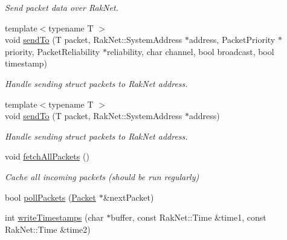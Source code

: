 \begin{DoxyCompactItemize}
\begin{DoxyCompactList}\small\item\em Send packet data over Rak\-Net. \end{DoxyCompactList}\item 
\hypertarget{class_champ_net_1_1_network_ad24d4552c6b597b5667965c323221aaa}{{\footnotesize template$<$typename T $>$ }\\void \hyperlink{class_champ_net_1_1_network_ad24d4552c6b597b5667965c323221aaa}{send\-To} (T packet, Rak\-Net\-::\-System\-Address $\ast$address, Packet\-Priority $\ast$priority, Packet\-Reliability $\ast$reliability, char channel, bool broadcast, bool timestamp)}\label{class_champ_net_1_1_network_ad24d4552c6b597b5667965c323221aaa}

\begin{DoxyCompactList}\small\item\em Handle sending struct packets to Rak\-Net address. \end{DoxyCompactList}\item 
\hypertarget{class_champ_net_1_1_network_abcd324ec71ef70454b7e4476f070c932}{{\footnotesize template$<$typename T $>$ }\\void \hyperlink{class_champ_net_1_1_network_abcd324ec71ef70454b7e4476f070c932}{send\-To} (T packet, Rak\-Net\-::\-System\-Address $\ast$address)}\label{class_champ_net_1_1_network_abcd324ec71ef70454b7e4476f070c932}

\begin{DoxyCompactList}\small\item\em Handle sending struct packets to Rak\-Net address. \end{DoxyCompactList}\item 
\hypertarget{class_champ_net_1_1_network_a981aef84fbe239079ea158931e5eeb71}{void \hyperlink{class_champ_net_1_1_network_a981aef84fbe239079ea158931e5eeb71}{fetch\-All\-Packets} ()}\label{class_champ_net_1_1_network_a981aef84fbe239079ea158931e5eeb71}

\begin{DoxyCompactList}\small\item\em Cache all incoming packets (should be run regularly) \end{DoxyCompactList}\item 
bool \hyperlink{class_champ_net_1_1_network_ae01cddc2981169cda9f4d65661c204f6}{poll\-Packets} (\hyperlink{class_champ_net_1_1_packet}{Packet} $\ast$\&next\-Packet)
\item 
\hypertarget{class_champ_net_1_1_network_af31e6a74b5354057bd01c95670e3c7a3}{int \hyperlink{class_champ_net_1_1_network_af31e6a74b5354057bd01c95670e3c7a3}{write\-Timestamps} (char $\ast$buffer, const Rak\-Net\-::\-Time \&time1, const Rak\-Net\-::\-Time \&time2)}\label{class_champ_net_1_1_network_af31e6a74b5354057bd01c95670e3c7a3}


\end{DoxyCompactItemize}
